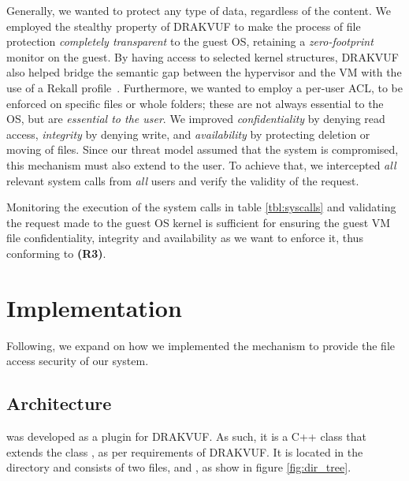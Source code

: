 \par Generally, we wanted to protect any type of data, regardless of the content. We employed the stealthy property of DRAKVUF to make the process of file protection \emph{completely transparent} to the guest \ac{OS}, retaining a \emph{zero-footprint} monitor on the guest. By having access to selected kernel structures, DRAKVUF also helped bridge the semantic gap between the hypervisor and the \ac{VM} with the use of a Rekall profile~\cite{rekall}. Furthermore, we wanted to employ a per-user \ac{ACL}, to be enforced on specific files or whole folders; these are not always essential to the \ac{OS}, but are \emph{essential to the user}. We improved \emph{confidentiality} by denying read access, \emph{integrity} by denying write, and \emph{availability} by protecting deletion or moving of files. Since our threat model assumed that the system is compromised, this mechanism must also extend to the  user. To achieve that, we intercepted \emph{all} relevant system calls from \emph{all} users and verify the validity of the request. 

\par Monitoring the execution of the system calls in table \ref{tbl:syscalls} and validating the request made to the guest \ac{OS} kernel is sufficient for ensuring the guest \ac{VM} file confidentiality, integrity and availability as we want to enforce it, thus conforming to \textbf{(R3)}.


\section{Implementation}\label{sec:implementation}

\par Following, we expand on how we implemented the mechanism to provide the file access security of our system.

\subsection{Architecture}\label{sub:arch}

\par {} was developed as a plugin for DRAKVUF. As such, it is a C++ class that extends the class , as per requirements of DRAKVUF. It is located in the directory  and consists of two files,  and , as show in figure \ref{fig:dir_tree}. 

